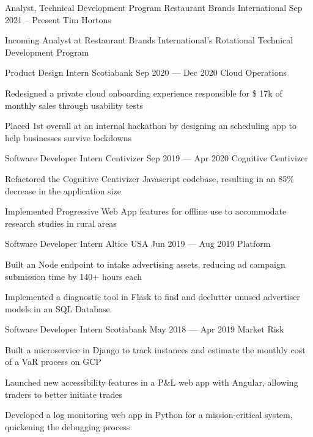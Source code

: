 \begin{cventries}
  \cventry
      {Analyst, Technical Development Program}
      {Restaurant Brands International}
      {}
      {Sep 2021 -- Present}
      {Tim Hortons}
      {
        \begin{cvitems}
          \item {Incoming Analyst at Restaurant Brands International's Rotational Technical Development Program}
        \end{cvitems}
      }
  \cventry
    {Product Design Intern}
    {Scotiabank}
    {}
    {Sep 2020 --- Dec 2020}
    {Cloud Operations}
    {
      \begin{cvitems}
        \item {Redesigned a private cloud onboarding experience responsible for \$ 17k of monthly sales through usability tests}
        \item {Placed 1st overall at an internal hackathon by designing an scheduling app to help businesses survive lockdowns}
      \end{cvitems}
    }
  \cventry
    {Software Developer Intern}
    {Centivizer}
    {}
    {Sep 2019 --- Apr 2020}
    {Cognitive Centivizer}
    {
      \begin{cvitems}
        \item {Refactored the Cognitive Centivizer Javascript codebase, resulting in an 85\% decrease in the application size}
        \item {Implemented Progressive Web App features for offline use to accommodate research studies in rural areas}
      \end{cvitems}
    }

  \cventry
    {Software Developer Intern}
    {Altice USA}
    {}
    {Jun 2019 --- Aug 2019}
    {Platform}
    {
    \begin{cvitems}
      \item {Built an Node endpoint to intake advertising assets, reducing ad campaign submission time by 140+ hours each}
      \item {Implemented a diagnostic tool in Flask to find and declutter unused advertiser models in an SQL Database}
    \end{cvitems}
    }

  \cventry
    {Software Developer Intern}
    {Scotiabank}
    {}
    {May 2018 --- Apr 2019}
    {Market Risk}
    {
      \begin{cvitems}
        \item {Built a microservice in Django to track instances and estimate the monthly cost of a VaR process on GCP}
        \item {Launched new accessibility features in a P\&L web app with Angular, allowing traders to better initiate trades}
        \item {Developed a log monitoring web app in Python for a mission-critical system, quickening the debugging process}
      \end{cvitems}
    }
\end{cventries}
